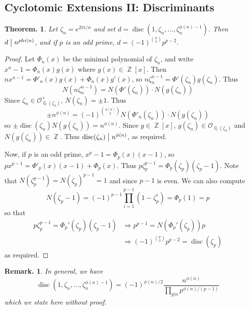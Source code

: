 \documentclass[11pt, a4paper]{memoir}
\DeclareMathOperator{\Q}{{\mathbb{Q}}}
\DeclareMathOperator{\Z}{{\mathbb{Z}}}
\renewcommand{\div}{\bigm|}
\theoremstyle{change}
\newtheorem{theorem}{Theorem.}[section]
\theoremstyle{plain}
\theoremstyle{nonumberplain}
\newtheorem{remark}{Remark.}
\newtheorem{proof}{Proof}
\DeclareMathOperator{\disc}{disc}
\numberwithin{equation}{section}
\begin{document}
\subsection{Cyclotomic Extensions II: Discriminants}
\begin{theorem}\label{t:disc-cycl}
    Let $\zeta_n=e^{2\pi i/n}$ and set $d=\disc\left(1,\zeta_n,\ldots,\zeta_n^{\phi(n)-1}\right)$.
    Then $d\div n^{phi(n)}$, and if $p$ is an odd prime, $d=(-1)^{\binom{p}{2}}p^{p-2}$.
\end{theorem}
\begin{proof}
    Let $\Phi_n(x)$ be the minimal polynomial of $\zeta_n$, and write $x^n-1=\Phi_n(x)g(x)$ where $g(x)\in\Z[x]$.
    Then $nx^{n-1}=\Phi'_n(x)g(x)+\Phi_n(x)g'(x)$, so $n\zeta_n^{n-1}=\Phi'(\zeta_n)g(\zeta_n)$.
    Thus
    \begin{equation*}
        N\left(n\zeta_n^{n-1}\right)=N\left(\Phi'(\zeta_n)\right)\cdot N\left(g(\zeta_n)\right)
    \end{equation*}
    Since $\zeta_n\in\mathcal{O}^\times_{\Q(\zeta_n)}$, $N(\zeta_n)=\pm 1$.
    Thus
    \begin{equation*}
        \pm n^{\phi(n)}=(-1)^{\binom{\phi(n)}{2}}N\left(\Phi'_n(\zeta_n)\right)\cdot N(g(\zeta_n))
    \end{equation*}
    so $\pm\disc(\zeta_n)N(g(\zeta_n))=n^{\phi(n)}$.
    Since $g\in\Z[x]$, $g(\zeta_n)\in\mathcal{O}_{\Q(\zeta_n)}$ and $N(g(\zeta_n))\in\Z$.
    Thus $\disc(\zeta_n)\div n^{\phi(n)}$, as required.

    Now, if $p$ is an odd prime, $x^p-1=\Phi_p(x)(x-1)$, so $px^{p-1}=\Phi'_p(x)(x-1)+\Phi_p(x)$.
    Thus $p\zeta_p^{p-1}=\Phi_p(\zeta_p)(\zeta_p-1)$.
    Note that $N(\zeta_p^{p-1})=N(\zeta_p)^{p-1}=1$ and since $p-1$ is even.
    We can also compute
    \begin{equation*}
        N(\zeta_p-1)=(-1)^{p-1}\prod_{i=1}^{p-1}(1-\zeta_p^i)=\Phi_p(1)=p
    \end{equation*}
    so that
    \begin{align*}
        p\zeta_p^{p-1}=\Phi_p'(\zeta_p)(\zeta_p-1) &\Rightarrow p^{p-1} = N(\Phi_p'(\zeta_p))p\\
                                                   &\Rightarrow (-1)^{\binom{p}{2}}p^{p-2}=\disc(\zeta_p)
    \end{align*}
    as required.
\end{proof}
\begin{remark}
    In general, we have
    \begin{equation*}
        \disc\left(1,\zeta_n,\ldots,\zeta_n^{\phi(n)-1}\right) = (-1)^{\phi(n)/2}\frac{n^{\phi(n)}}{\prod_{p|n}p^{\phi(n)/(p-1)}}
    \end{equation*}
    which we state here without proof.
\end{remark}
\end{document}
